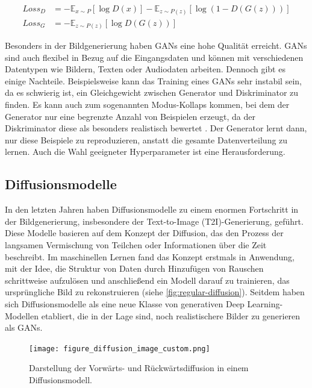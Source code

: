 \begin{equation}
	\begin{aligned}
		Loss_D &= -\mathbb{E}_{x \sim P}[\log D(x)] - \mathbb{E}_{z \sim P(z)}[\log(1 - D(G(z)))] \\
		Loss_G &= -\mathbb{E}_{z \sim P(z)}[\log D(G(z))]
	\end{aligned}
	\label{eq:gan-loss}
\end{equation}

Besonders in der Bildgenerierung haben GANs eine hohe Qualität erreicht. GANs sind auch flexibel in Bezug auf die Eingangsdaten und können mit verschiedenen Datentypen wie Bildern, Texten oder Audiodaten arbeiten. Dennoch gibt es einige Nachteile. Beispielsweise kann das Training eines GANs sehr instabil sein, da es schwierig ist, ein Gleichgewicht zwischen Generator und Diskriminator zu finden. Es kann auch zum sogenannten Modus-Kollaps kommen, bei dem der Generator nur eine begrenzte Anzahl von Beispielen erzeugt, da der Diskriminator diese als besonders realistisch bewertet \parencite{Foster2020gendeeplearning}. Der Generator lernt dann, nur diese Beispiele zu reproduzieren, anstatt die gesamte Datenverteilung zu lernen. Auch die Wahl geeigneter Hyperparameter ist eine Herausforderung.

\subsection{Diffusionsmodelle} \label{subsec:diffusion-models}

In den letzten Jahren haben Diffusionsmodelle zu einem enormen Fortschritt in der Bildgenerierung, insbesondere der Text-to-Image (T2I)-Generierung, geführt. Diese Modelle basieren auf dem Konzept der Diffusion, das den Prozess der langsamen Vermischung von Teilchen oder Informationen über die Zeit beschreibt. Im maschinellen Lernen fand das Konzept erstmals in \parencite{SohlDickstein2015diffusionmodels} Anwendung, mit der Idee, die Struktur von Daten durch Hinzufügen von Rauschen schrittweise aufzulösen und anschließend ein Modell darauf zu trainieren, das ursprüngliche Bild zu rekonstruieren (siehe \autoref{fig:regular-diffusion}). Seitdem haben sich Diffusionsmodelle als eine neue Klasse von generativen Deep Learning-Modellen etabliert, die in der Lage sind, noch realistischere Bilder zu generieren als GANs.

\begin{figure}[h]
	\centering
	\texttt{[image: figure\_diffusion\_image\_custom.png]}
	\caption[Darstellung der Vorwärts- und Rückwärtsdiffusion in einem Diffusionsmodell.]{Darstellung der Vorwärts- und Rückwärtsdiffusion in einem Diffusionsmodell.}
	\label{fig:regular-diffusion}
\end{figure}

